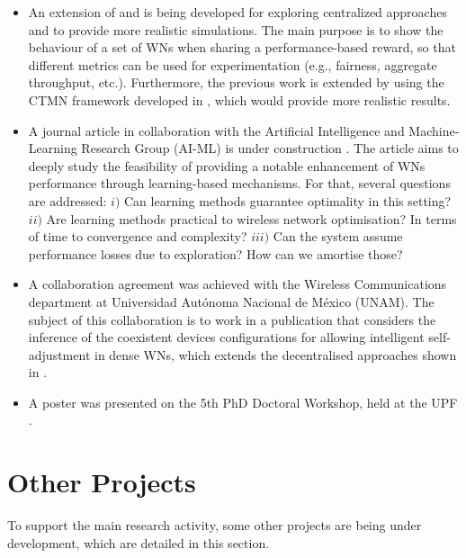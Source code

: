 \documentclass[12pt, a4paper,twoside]{tesi_upf}
\begin{document}
\begin{itemize}
				\item An extension of \cite{wilhelmi2017implications} and \cite{wilhelmi2017enhancing} is being developed for exploring centralized approaches and to provide more realistic simulations. The main purpose is to show the behaviour of a set of WNs when sharing a performance-based reward, so that different metrics can be used for experimentation (e.g., fairness, aggregate throughput, etc.). Furthermore, the previous work is extended by using the CTMN framework developed in \cite{barrachina2017ctmn}, which would provide more realistic results. 
				\item A journal article in collaboration with the Artificial Intelligence and Machine-Learning Research Group (AI-ML) is under construction \cite{bellalta2017learning}. The article aims to deeply study the feasibility of providing a notable enhancement of WNs performance through learning-based mechanisms. For that, several questions are addressed: $i)$ Can learning methods guarantee optimality in this setting? $ii)$ Are learning methods practical to wireless network optimisation? In terms of time to convergence and complexity? $iii)$ Can the system assume performance losses due to exploration? How can we amortise those?
					\item A collaboration agreement was achieved with the Wireless Communications department at Universidad Aut\'onoma Nacional de M\'exico (UNAM). The subject of this collaboration is to work in a publication that considers the inference of the coexistent devices configurations for allowing intelligent self-adjustment in dense WNs, which extends the decentralised approaches shown in \cite{wilhelmi2017implications, wilhelmi2017enhancing}.
				\item A poster was presented on the 5th PhD Doctoral Workshop, held at the UPF \cite{wilhelmi2017improving}.
			\end{itemize}	
			
		\section{Other Projects}
		\label{section:other_projects}	
			To support the main research activity, some other projects are being under development, which are detailed in this section.
\end{document}
